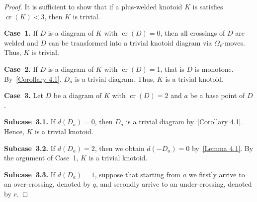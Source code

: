 \documentclass[11pt]{amsart}
\theoremstyle{noparens}
\numberwithin{equation}{section}
\numberwithin{equation}{section}
\begin{document}
\begin{proof}
It is sufficient to show that if a plus-welded knotoid $K$ is satisfies $\operatorname{cr}(K) < 3$, then $K$ is trivial. 
	
\textbf{Case~1.} If $D$ is a diagram of $K$  with $\operatorname{cr}(D) = 0$, then  all crossings of $D$ are welded and $D$ can be transformed into a trivial knotoid diagram via $\Omega_v$-moves. Thus, $K$ is trivial.
	
\textbf{Case~2.} If $D$ is a diagram of $K$ with  $\operatorname{cr}(D) = 1$, that is $D$ is monotone. By~\cref{Corollary 4.1}, $D_a$ is a trivial diagram. Thus, $K$ is a trivial knotoid. 
	
\textbf{Case~3.} Let $D$ be a diagram of $K$ with $\operatorname{cr}(D) = 2$ and $a$ be a base point of $D$. 
	
\textbf{Subcase~3.1.} If $d(D_a)=0$, then $D_a$ is a trivial diagram by~\cref{Corollary 4.1}. Hence, $K$ is a trivial knotoid.
	
\textbf{Subcase~3.2.} If $d(D_a)=2$, then we obtain $d(-D_a)=0$ by~\cref{Lemma 4.1}. By the argument of Case~1, $K$ is a trivial knotoid. 
	
\textbf{Subcase~3.3.} If $d(D_a) = 1$, suppose that starting from $a$ we firstly arrive to an over-crossing, denoted by $q$, and secondly arrive to an under-crossing, denoted by $r$. 


\end{proof}
\end{document}
